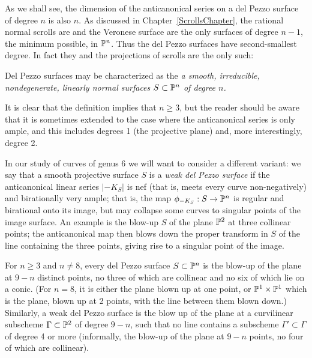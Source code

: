 \begin{fact}
 As we shall see, the dimension of the anticanonical series on a del Pezzo surface of degree $n$ is also $n$. As discussed in
Chapter~\ref{ScrollsChapter}, the rational normal scrolls are and the Veronese surface are the only surfaces of
degree $n-1$, the minimum possible, in $\PP^n$. Thus the del Pezzo surfaces have second-smallest degree.
In fact they and the projections of scrolls are the only such: 

Del Pezzo surfaces may be characterized as the \emph{a smooth, irreducible, nondegenerate, linearly normal  surfaces $S \subset \PP^n$ of degree $n$.}
\end{fact}

It is clear that the definition implies that $n\geq 3$, but the reader should be aware that it is sometimes extended to the case where
the anticanonical series is only ample, and this includes degrees 1 (the projective plane) and, more interestingly, degree 2.

In our study of curves of genus 6 we will want to consider a different variant:  we say that a smooth projective surface $S$ is a \emph{weak del Pezzo surface} if the anticanonical linear series $|-K_S|$ is nef (that is, meets every curve non-negatively) and birationally very ample; that is, the map $\phi_{-K_S} : S \to \PP^n$ is regular and birational onto its image, but may collapse some curves to singular points of the image surface. An example is the blow-up $S$ of the plane $\PP^2$ at three collinear points; the anticanonical map then blows down the proper transform in $S$ of the line containing the three points, giving rise to a singular point of the image.


\begin{proposition}
For $n \geq 3$ and $n \neq 8$, every del Pezzo surface $S \subset \PP^n$ is the blow-up of the plane at $9-n$ distinct points, no three of which are collinear and no six of which lie on a conic. (For $n=8$, it is either the plane blown up at one point, or $\PP^1 \times \PP^1$ which is the plane, blown up at 2 points, with the line between them blown down.) Similarly, a weak del Pezzo surface is the blow up of the plane at a curvilinear subscheme $\Gamma \subset \PP^2$ of degree $9-n$, such that no line contains a subscheme $\Gamma' \subset \Gamma$ of degree 4 or more (informally, the blow-up of the plane at $9-n$ points, no four of which are collinear).
\end{proposition}

